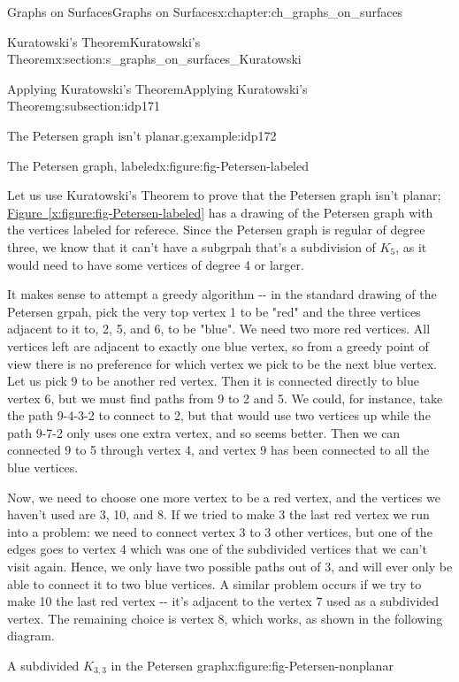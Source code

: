 \documentclass[oneside,10pt,]{book}
\newcommand{\xreffont}{\relax}
\numberwithin{equation}{section}
\begin{document}
\begin{chapterptx}{Graphs on Surfaces}{}{Graphs on Surfaces}{}{}{x:chapter:ch_graphs_on_surfaces}
\begin{sectionptx}{Kuratowski's Theorem}{}{Kuratowski's Theorem}{}{}{x:section:s_graphs_on_surfaces_Kuratowski}
\begin{subsectionptx}{Applying Kuratowski's Theorem}{}{Applying Kuratowski's Theorem}{}{}{g:subsection:idp171}
\begin{example}{The Petersen graph isn't planar.}{g:example:idp172}
\begin{figureptx}{The Petersen graph, labeled}{x:figure:fig-Petersen-labeled}{}
\begin{image}{0.05}{0.9}{0.05}
{\begin{tikzpicture}
\end{tikzpicture}
}%
\end{image}%
\tcblower
\end{figureptx}%
Let us use Kuratowski's Theorem to prove that the Petersen graph isn't planar; \hyperref[x:figure:fig-Petersen-labeled]{Figure~{\xreffont\ref{x:figure:fig-Petersen-labeled}}} has a drawing of the Petersen graph with the vertices labeled for referece.  Since the Petersen graph is regular of degree three, we know that it can't have a subgrpah that's a subdivision of \(K_5\), as it would need to have some vertices of degree 4 or larger.%
\par
It makes sense to attempt a greedy algorithm -{}-{} in the standard drawing of the Petersen grpah, pick the very top vertex 1 to be "red" and the three vertices adjacent to it to, 2, 5, and 6, to be "blue".  We need two more red vertices.  All vertices left are adjacent to exactly one blue vertex, so from a greedy point of view there is no preference for which vertex we pick to be the next blue vertex.  Let us pick 9 to be another red vertex.  Then it is connected directly to blue vertex 6, but we must find paths from 9 to 2 and 5.  We could, for instance, take the path 9-4-3-2 to connect to 2, but that would use two vertices up while the path 9-7-2 only uses one extra vertex, and so seems better.  Then we can connected 9 to 5 through vertex 4, and vertex 9 has been connected to all the blue vertices.%
\par
Now, we need to choose one more vertex to be a red vertex, and the vertices we haven't used are 3, 10, and 8.  If we tried to make 3 the last red vertex we run into a problem: we need to connect vertex 3 to 3 other vertices, but one of the edges goes to vertex 4 which was one of the subdivided vertices that we can't visit again.  Hence, we only have two possible paths out of 3, and will ever only be able to connect it to two blue vertices.  A similar problem occurs if we try to make 10 the last red vertex -{}-{} it's adjacent to the vertex 7 used as a subdivided vertex.  The remaining choice is vertex 8, which works, as shown in the following diagram.%
\begin{figureptx}{A subdivided \(K_{3,3}\) in the Petersen graph}{x:figure:fig-Petersen-nonplanar}{}%
\begin{image}{0.05}{0.9}{0.05}%
\resizebox{\linewidth}{!}{%
\begin{tikzpicture}


\end{tikzpicture}}
\end{image}
\end{figureptx}
\end{example}
\end{subsectionptx}
\end{sectionptx}
\end{chapterptx}
\end{document}
